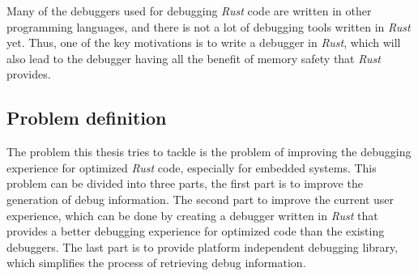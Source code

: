 Many of the debuggers used for debugging \emph{Rust} code are written in other programming languages, and there is not a lot of debugging tools written in \emph{Rust} yet.
Thus, one of the key motivations is to write a debugger in \emph{Rust}, which will also lead to the debugger having all the benefit of memory safety that \emph{Rust} provides.





\subsection{Problem definition}
\label{sec:problemdefinition}
 

The problem this thesis tries to tackle is the problem of improving the debugging experience for optimized \emph{Rust} code, especially for embedded systems.
This problem can be divided into three parts, the first part is to improve the generation of debug information.
The second part to improve the current user experience, which can be done by creating a debugger written in \emph{Rust} that provides a better debugging experience for optimized code than the existing debuggers.
The last part is to provide platform independent debugging library, which simplifies the process of retrieving debug information.


